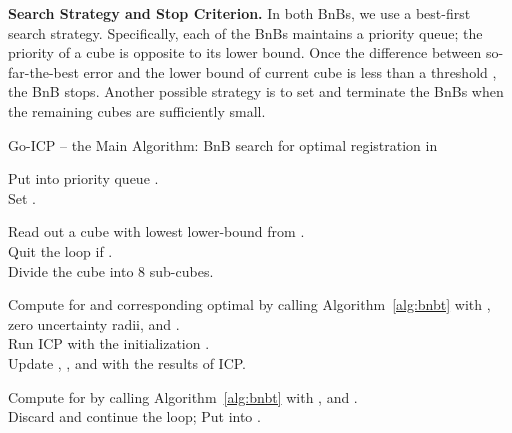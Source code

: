 \documentclass[10pt,journal,cspaper,compsoc]{IEEEtran}
\begin{document}
\vspace{0.06in}
\noindent\textbf{Search Strategy and Stop Criterion.} In both BnBs, we use a best-first search strategy. Specifically, each of the BnBs maintains a priority queue; the priority of a cube is opposite to its lower bound. Once the difference between so-far-the-best error  and the lower bound  of current cube is less than a threshold , the BnB stops. Another possible strategy is to set  and terminate the BnBs when the remaining cubes are sufficiently small.

\begin{algorithm}[!tb]
\footnotesize
\caption{Go-ICP -- the Main Algorithm: BnB search for optimal registration in }\label{alg:bnbrt}
    Put  into priority queue .\\
    Set .\\

    \Begin
    {
        Read out a cube with lowest lower-bound  from .\\
        Quit the loop if . \\
        Divide the cube into 8 sub-cubes.\\
        {
            Compute  for  and corresponding optimal  by calling Algorithm~\ref{alg:bnbt} with , zero uncertainty radii, and . \\
            \If{}
            {
                {Run ICP with the initialization .} \label{ln:icprefine1}\\
                Update , , and  with the results of ICP. \label{ln:icprefine2}
            }

            Compute  for  by calling Algorithm~\ref{alg:bnbt} with ,  and .\\
            \If{}
            {
                Discard  and continue the loop;
            }
            Put  into .
        }
    }
\end{algorithm}
\end{document}
